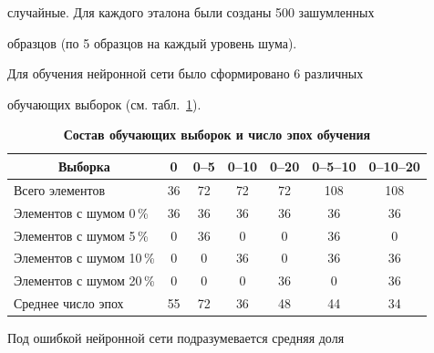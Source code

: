 случайные. Для каждого эталона были созданы 500 зашумленных

образцов (по 5 образцов на каждый уровень шума).



Для обучения нейронной сети было сформировано 6 различных

обучающих выборок (см. табл.~\ref{fertsev:tbl-trainset}).



\begin{table}[h]

\centering \small

\caption{\bf Состав обучающих выборок и число эпох обучения}\vspace{-3mm}

\begin{tabular}{l|c|c|c|c|c|c}

  \hline

\multicolumn{1}{c|}{\footnotesize  Выборка} & \footnotesize 0 & \footnotesize 0--5 & \footnotesize 0--10  \footnotesize& 0--20 & \footnotesize 0--5--10 & \footnotesize 0--10--20 \\

  \hline

  \rule{0mm}{12pt}%

  Всего элементов & 36 & 72 & 72 & 72 & 108 & 108 \\

  Элементов с шумом 0\,\% & 36 & 36 & 36 & 36 & 36 & 36 \\

  Элементов с шумом 5\,\% & 0 & 36 & 0 & 0 & 36 & 0 \\

  Элементов с шумом 10\,\% & 0 & 0 & 36 & 0 & 36 & 36 \\

  Элементов с шумом 20\,\% & 0 & 0 & 0 & 36 & 0 & 36 \\

    Среднее число эпох & 55 & 72 & 36 & 48 & 44 & 34 \\

  \hline

\end{tabular}

\label{fertsev:tbl-trainset} \vspace{-5mm}

\end{table}



Под ошибкой нейронной сети подразумевается средняя доля

